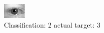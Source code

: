 \begin{figure}[h!]
\begin{center}
\includegraphics[width=0.60\columnwidth]{figures/ID606_class_2_target_3.png}
\end{center}
\caption{ Classification: 2 actual target: 3}
\label{fig:ID606_class_2_target_3}
\end{figure}
